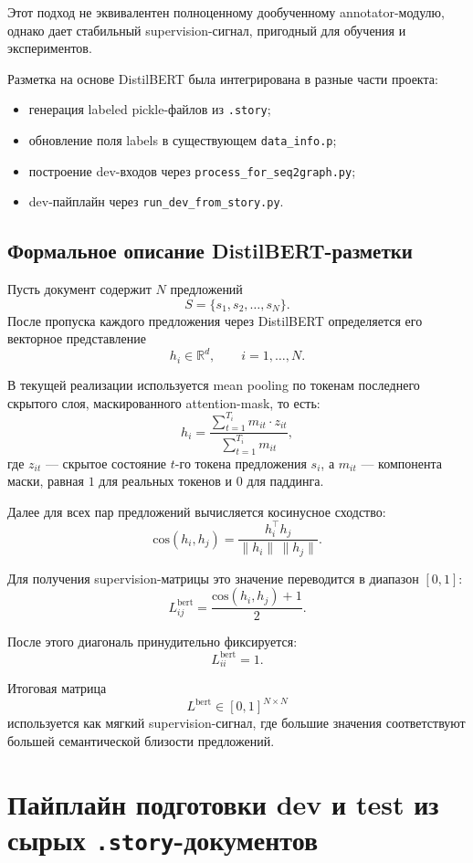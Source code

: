 \documentclass[12pt,a4paper]{article}
\begin{document}
Этот подход не эквивалентен полноценному дообученному annotator-модулю, однако дает
стабильный supervision-сигнал, пригодный для обучения и экспериментов.

Разметка на основе DistilBERT была интегрирована в разные части проекта:

\begin{itemize}
    \item генерация labeled pickle-файлов из \texttt{.story};
    \item обновление поля labels в существующем \texttt{data\_info.p};
    \item построение dev-входов через \texttt{process\_for\_seq2graph.py};
    \item dev-пайплайн через \texttt{run\_dev\_from\_story.py}.
\end{itemize}

\subsection{Формальное описание DistilBERT-разметки}

Пусть документ содержит $N$ предложений
\[
S = \{s_1, s_2, \dots, s_N\}.
\]
После пропуска каждого предложения через DistilBERT определяется его векторное
представление
\[
h_i \in \mathbb{R}^{d}, \qquad i=1,\dots,N.
\]

В текущей реализации используется mean pooling по токенам последнего скрытого слоя,
маскированного attention-mask, то есть:
\[
h_i = \frac{\sum_{t=1}^{T_i} m_{it} \cdot z_{it}}{\sum_{t=1}^{T_i} m_{it}},
\]
где $z_{it}$ --- скрытое состояние $t$-го токена предложения $s_i$, а $m_{it}$ ---
компонента маски, равная $1$ для реальных токенов и $0$ для паддинга.

Далее для всех пар предложений вычисляется косинусное сходство:
\[
\mathrm{cos}(h_i, h_j) = \frac{h_i^\top h_j}{\|h_i\|\,\|h_j\|}.
\]

Для получения supervision-матрицы это значение переводится в диапазон $[0,1]$:
\[
L^{\text{bert}}_{ij} = \frac{\mathrm{cos}(h_i, h_j) + 1}{2}.
\]

После этого диагональ принудительно фиксируется:
\[
L^{\text{bert}}_{ii} = 1.
\]

Итоговая матрица
\[
L^{\text{bert}} \in [0,1]^{N \times N}
\]
используется как мягкий supervision-сигнал, где большие значения соответствуют большей
семантической близости предложений.

\section{Пайплайн подготовки dev и test из сырых \texttt{.story}-документов}
\end{document}
